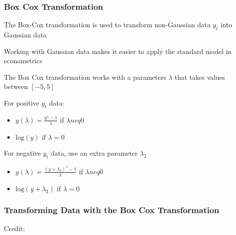 \documentclass{beamer}
\newenvironment{wideitemize}{\itemize\addtolength{\itemsep}{10pt}}{\enditemize}
\begin{document}
    \begin{frame}
      \frametitle{Box Cox Transformation}

      \begin{wideitemize}
        \item The Box-Cox transformation is used to transform non-Gaussian data $y_t$ into Gaussian  data
        \item Working with Gaussian data makes it easier to apply the standard model in econometrics
        \item The Box Cox transformation works with a parameters $\lambda$ that takes values between $[-5, 5]$

        \item For positive $y_t$ data:
          \begin{itemize}
          \item $y(\lambda) = \frac{y^{\lambda}-1}{\lambda}$ if $\lambda neq 0$
          \item $\text{log}(y)$ if $\lambda = 0$
          \end{itemize}

        \item For negative $y_t$ data, use an extra parameter $\lambda_2$ 
          \begin{itemize}
          \item $y(\lambda) = \frac{(y + \lambda_2)^{\lambda}-1}{\lambda}$ if $\lambda neq 0$
          \item $\text{log}(y + \lambda_2)$ if $\lambda = 0$
          \end{itemize}          
      \end{wideitemize}      
    \end{frame}


    \begin{frame}
      \frametitle{Transforming Data with the Box Cox Transformation}
  \hspace*{15pt}\hbox{\scriptsize Credit:}      
    \end{frame}
\end{document}
